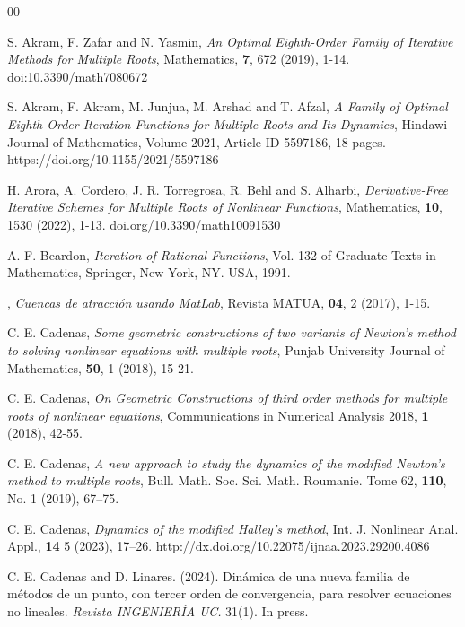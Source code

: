 \documentclass{article}
\theoremstyle{definition}
\theoremstyle{remark}
\begin{document}
\newpage
\begin{thebibliography}{00}

	 S. Akram, F. Zafar and N. Yasmin, \emph{An Optimal Eighth-Order Family of Iterative Methods for Multiple Roots}, Mathematics, \textbf{7}, 672 (2019), 1-14. doi:10.3390/math7080672

	 S. Akram, F. Akram, M. Junjua, M. Arshad and T. Afzal, \emph{A Family of Optimal Eighth Order Iteration Functions for Multiple 	Roots and Its Dynamics}, Hindawi Journal of Mathematics, Volume 2021, Article ID 5597186, 18 pages. https://doi.org/10.1155/2021/5597186

	 H. Arora, A. Cordero, J. R. Torregrosa, R. Behl and S. Alharbi, \emph{Derivative-Free Iterative Schemes for Multiple Roots of Nonlinear Functions}, Mathematics, \textbf{10}, 1530 (2022), 1-13. doi.org/10.3390/math10091530


	 A. F. Beardon, \emph{Iteration of Rational Functions}, Vol. 132 of Graduate Texts in Mathematics, Springer, New York, NY. USA, 1991.

	, \emph{Cuencas de atracci\'on usando MatLab}, Revista MATUA, \textbf{04}, 2 (2017), 1-15.

	 { C. E. Cadenas}, \emph{Some geometric constructions of two variants of Newton's method to solving nonlinear equations with multiple roots}, Punjab University Journal of Mathematics, \textbf{50}, 1 (2018), 15-21.

	 { C. E. Cadenas}, \emph{On Geometric Constructions of third order methods for multiple roots of nonlinear equations}, Communications in Numerical Analysis 2018, \textbf{1} (2018), 42-55.

	 { C. E. Cadenas}, \emph{A new approach to study the dynamics of the modified Newton’s method to multiple roots}, Bull. Math. Soc. Sci. Math. Roumanie. Tome 62, \textbf{110}, No. 1 (2019), 67–75.

	 { C. E. Cadenas}, \emph{Dynamics of the modified Halley’s method}, Int. J. Nonlinear Anal. Appl., \textbf{14} 5 (2023), 17–26. http://dx.doi.org/10.22075/ijnaa.2023.29200.4086


 C. E. Cadenas  and D. Linares. (2024). Dinámica de una nueva familia de métodos de un punto, con tercer orden de convergencia, para resolver ecuaciones no lineales. \textit{Revista INGENIERÍA UC.} 31(1). In press.


\end{thebibliography}
\end{document}
